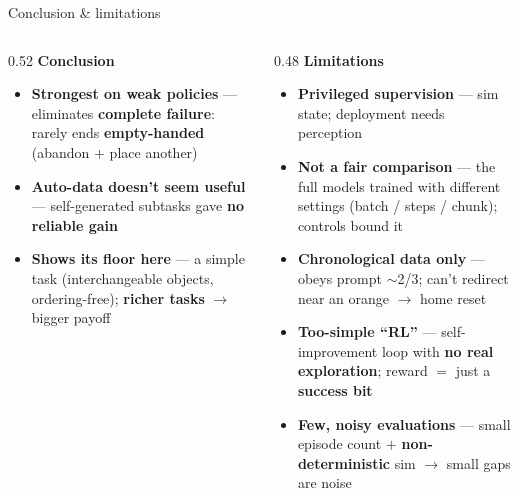 \documentclass[aspectratio=169,10pt]{beamer}
\newcommand{\hl}[1]{\textcolor{epflred}{\textbf{#1}}}
\begin{document}
\begin{frame}{Conclusion \& limitations}
  \begin{columns}[t]
    \begin{column}{0.52\textwidth}
      \small
      \textbf{Conclusion}
      \begin{itemize}
        \item \hl{Strongest on weak policies} --- eliminates \hl{complete failure}: rarely ends \hl{empty-handed} (abandon $+$ place another)
        \item \hl{Auto-data doesn't seem useful} --- self-generated subtasks gave \hl{no reliable gain}
        \item \hl{Shows its floor here} --- a simple task (interchangeable objects, ordering-free); \hl{richer tasks} $\rightarrow$ bigger payoff
      \end{itemize}
    \end{column}
    \begin{column}{0.48\textwidth}
      \small
      \textbf{Limitations}
      \begin{itemize}
        \item \hl{Privileged supervision} --- sim state; deployment needs perception
        \item \hl{Not a fair comparison} --- the full models trained with different settings (batch / steps / chunk); controls bound it
        \item \hl{Chronological data only} --- obeys prompt $\sim$2/3; can't redirect near an orange $\rightarrow$ home reset
        \item \hl{Too-simple ``RL''} --- self-improvement loop with \hl{no real exploration}; reward $=$ just a \hl{success bit}
        \item \hl{Few, noisy evaluations} --- small episode count $+$ \hl{non-deterministic} sim $\rightarrow$ small gaps are noise
      \end{itemize}
    \end{column}
  \end{columns}
\end{frame}
\end{document}
